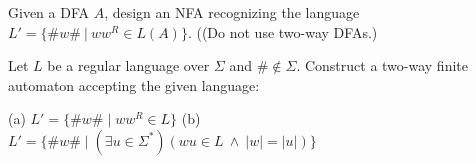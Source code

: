 \documentclass[a4paper,12pt]{amsart}
\begin{document}
\begin{problem}
\begin{multicols}{3}
    \end{multicols}

\end{problem}


\begin{problem}

    Given a DFA $A$, design an NFA recognizing the language $L'=\{\#w\#\ |\ ww^R\in L(A)\}$. ((Do not use two-way DFAs.)

\end{problem}

\begin{problem}

    Let $L$ be a regular language over $\Sigma$ and $\#\notin\Sigma$. Construct a two-way finite automaton accepting the given language: 

    (a) $L' = \{\#w\#\mid ww^R \in L\}$ \hfill (b) $L' = \{\#w\#\mid (\exists u \in\Sigma^*)( wu \in L\ \wedge \ |w|=|u|)\}$

\end{problem}
\end{document}
